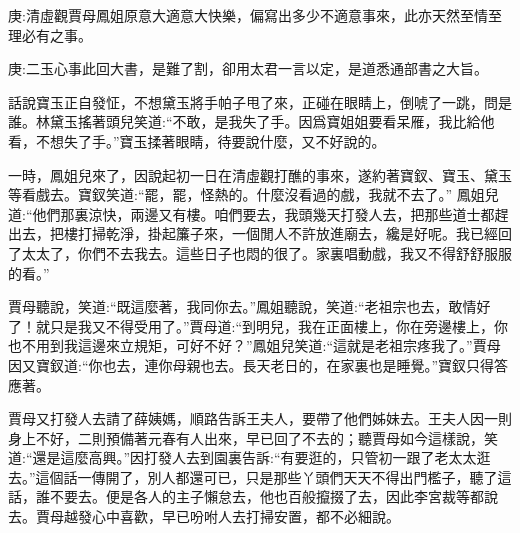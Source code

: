 

\begin{parag}
    \begin{note}庚:清虛觀賈母鳳姐原意大適意大快樂，偏寫出多少不適意事來，此亦天然至情至理必有之事。\end{note}
\end{parag}


\begin{parag}
    \begin{note}庚:二玉心事此回大書，是難了割，卻用太君一言以定，是道悉通部書之大旨。\end{note}
\end{parag}


\begin{parag}
    話說寶玉正自發怔，不想黛玉將手帕子甩了來，正碰在眼睛上，倒唬了一跳，問是誰。林黛玉搖著頭兒笑道:“不敢，是我失了手。因爲寶姐姐要看呆雁，我比給他看，不想失了手。”寶玉揉著眼睛，待要說什麼，又不好說的。
\end{parag}


\begin{parag}
    一時，鳳姐兒來了，因說起初一日在清虛觀打醮的事來，遂約著寶釵、寶玉、黛玉等看戲去。寶釵笑道:“罷，罷，怪熱的。什麼沒看過的戲，我就不去了。” 鳳姐兒道:“他們那裏涼快，兩邊又有樓。咱們要去，我頭幾天打發人去，把那些道士都趕出去，把樓打掃乾淨，掛起簾子來，一個閒人不許放進廟去，纔是好呢。我已經回了太太了，你們不去我去。這些日子也悶的很了。家裏唱動戲，我又不得舒舒服服的看。”
\end{parag}


\begin{parag}
    賈母聽說，笑道:“既這麼著，我同你去。”鳳姐聽說，笑道:“老祖宗也去，敢情好了！就只是我又不得受用了。”賈母道:“到明兒，我在正面樓上，你在旁邊樓上，你也不用到我這邊來立規矩，可好不好？”鳳姐兒笑道:“這就是老祖宗疼我了。”賈母因又寶釵道:“你也去，連你母親也去。長天老日的，在家裏也是睡覺。”寶釵只得答應著。
\end{parag}


\begin{parag}
    賈母又打發人去請了薛姨媽，順路告訴王夫人，要帶了他們姊妹去。王夫人因一則身上不好，二則預備著元春有人出來，早已回了不去的；聽賈母如今這樣說，笑道:“還是這麼高興。”因打發人去到園裏告訴:“有要逛的，只管初一跟了老太太逛去。”這個話一傳開了，別人都還可已，只是那些丫頭們天天不得出門檻子，聽了這話，誰不要去。便是各人的主子懶怠去，他也百般攛掇了去，因此李宮裁等都說去。賈母越發心中喜歡，早已吩咐人去打掃安置，都不必細說。
\end{parag}


